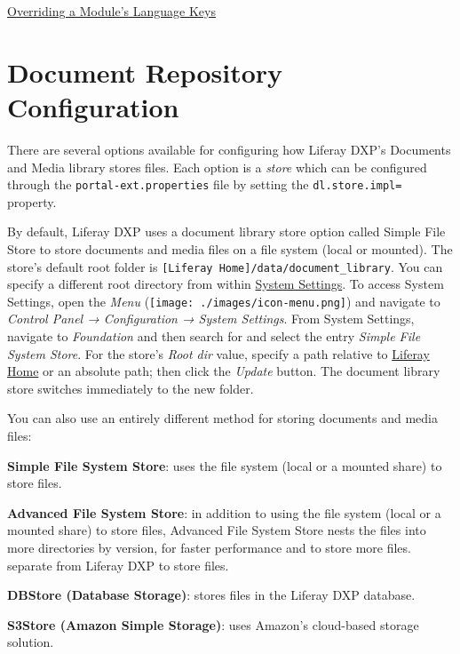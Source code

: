 \href{/docs/7-0/tutorials/-/knowledge_base/t/overriding-language-keys\#overriding-a-modules-language-keys}{Overriding
a Module's Language Keys}

\section{Document Repository
Configuration}\label{document-repository-configuration}

There are several options available for configuring how Liferay DXP's
Documents and Media library stores files. Each option is a \emph{store}
which can be configured through the \texttt{portal-ext.properties} file
by setting the \texttt{dl.store.impl=} property.

By default, Liferay DXP uses a document library store option called
Simple File Store to store documents and media files on a file system
(local or mounted). The store's default root folder is
\texttt{{[}Liferay\ Home{]}/data/document\_library}. You can specify a
different root directory from within
\href{/docs/7-0/user/-/knowledge_base/u/system-settings}{System
Settings}. To access System Settings, open the \emph{Menu}
(\texttt{[image: ./images/icon-menu.png]}) and navigate to
\emph{Control Panel → Configuration → System Settings}. From System
Settings, navigate to \emph{Foundation} and then search for and select
the entry \emph{Simple File System Store}. For the store's \emph{Root
dir} value, specify a path relative to
\href{/docs/7-0/deploy/-/knowledge_base/d/installing-product\#liferay-home}{Liferay
Home} or an absolute path; then click the \emph{Update} button. The
document library store switches immediately to the new folder.

You can also use an entirely different method for storing documents and
media files:

\textbf{Simple File System Store}: uses the file system (local or a
mounted share) to store files.

\textbf{Advanced File System Store}: in addition to using the file
system (local or a mounted share) to store files, Advanced File System
Store nests the files into more directories by version, for faster
performance and to store more files. separate from Liferay DXP to store
files.

\textbf{DBStore (Database Storage)}: stores files in the Liferay DXP
database.

\textbf{S3Store (Amazon Simple Storage)}: uses Amazon's cloud-based
storage solution.

